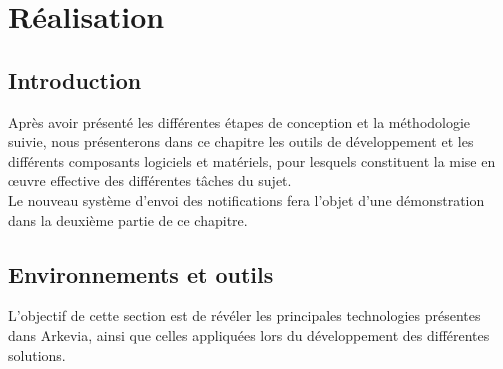 \section{Réalisation}

\subsection*{Introduction}

Après avoir présenté les différentes étapes de conception et la méthodologie suivie, nous présenterons dans ce chapitre les outils de développement et les différents composants logiciels et matériels, pour lesquels constituent la mise en œuvre effective des différentes tâches du sujet.\\

Le nouveau système d'envoi des notifications fera l'objet d'une démonstration dans la deuxième partie de ce chapitre.
\subsection{Environnements et outils}
L'objectif de cette section est de révéler les principales technologies présentes dans Arkevia, ainsi que celles appliquées lors du développement des différentes solutions. 
